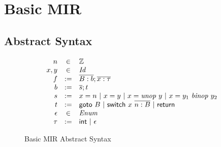 \documentclass[peerreview, 10pt]{IEEEtran}
\begin{document}
\section{Basic MIR}

\subsection{Abstract Syntax}

\begin{figure}[ht]
\centering
\begin{framed}
\[
  \begin{array}{@{}rcl@{}}
    n &\in& \mathbb{Z} \\
    x,y &\in& \mathit{Id} \\
    f &:=& \overline{B:b};\overline{x:\tau} \\
    b &:=& \overline{s}; t \\
    s &:=& x=n\ |\ x=y\ |\ x={\it unop}\ y\ |\ x=y_1\ {\it binop}\ y_2 \\
    t &:=& {\sf goto}\ B\ |\ {\sf switch}\ x\ \overline{n:B}\ |\ {\sf return} \\
    \epsilon &\in& \mathit{Enum} \\
    \tau &:=& {\sf int}\ |\ \epsilon \\
  \end{array}
\]
\end{framed}
\caption{Basic MIR Abstract Syntax}
  \label{fig:basic-absyn}
\end{figure}
\end{document}
